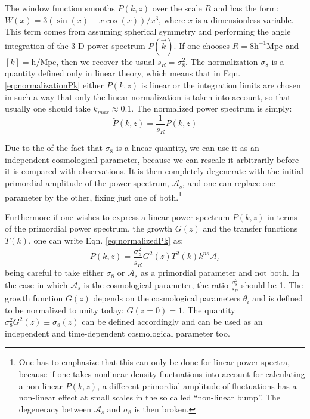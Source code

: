 The window function smooths $P(k,z)$ over the scale $R$ and has
the form: $W(x)=3(\sin(x)-x\cos(x))/x^{3}$, where $x$ is a dimensionless
variable. This term comes from assuming spherical symmetry and performing
the angle integration of the 3-D power spectrum $P(\vec{k})$. If
one chooses $R=8\mbox{h}^{-1}\mbox{Mpc}$ and $[k]=\mbox{h}/\mbox{Mpc}$,
then we recover the usual $s_{R}=\sigma_{8}^{2}$. The normalization
$\sigma_{8}$ is a quantity defined only in linear theory, which means
that in Eqn. \ref{eq:normalizationPk} either $P(k,z)$ is linear
or the integration limits are chosen in such a way that only the linear
normalization is taken into account, so that usually one should take
$k_{max}\approx0.1$. The normalized power spectrum is simply: 
\begin{equation}
\tilde{P}(k,z)=\frac{1}{s_{R}}P(k,z)
\end{equation}


Due to the of the fact that $\sigma_{8}$ is a linear quantity, we
can use it as an independent cosmological parameter, because we can
rescale it arbitrarily before it is compared with observations. It
is then completely degenerate with the initial primordial amplitude
of the power spectrum, $\mathcal{A}_{s}$, and one can replace one
parameter by the other, fixing just one of both.\footnote{One has to emphasize that this can only be done for linear power spectra,
	because if one takes nonlinear density fluctuations into account for
	calculating a non-linear $P(k,z)$, a different primordial amplitude
	of fluctuations has a non-linear effect at small scales in the so
	called ``non-linear bump''. The degeneracy between $\mathcal{A}_{s}$
	and $\sigma_{8}$ is then broken.}

Furthermore if one wishes to express a linear power spectrum $P(k,z)$
in terms of the primordial power spectrum, the growth $G(z)$ and
the transfer functions $T(k)$, one can write Eqn. \ref{eq:normalizedPk}
as: 
\begin{equation}
P(k,z)=\frac{\sigma_{8}^{2}}{s_{R}}G^{2}(z)T^{2}(k)k^{ns}\mathcal{A}_{s}
\end{equation}
being careful to take either $\sigma_{8}$ or $\mathcal{A}_{s}$ as
a primordial parameter and not both. In the case in which $\mathcal{A}_{s}$
is the cosmological parameter, the ratio $\frac{\sigma_{8}^{2}}{s_{R}}$
should be 1. The growth function $G(z)$ depends on the cosmological
parameters $\theta_{i}$ and is defined to be normalized to unity
today: $G(z=0)=1$. The quantity $\sigma_{8}^{2}G^{2}(z)\equiv\sigma_{8}(z)$
can be defined accordingly and can be used as an independent and time-dependent
cosmological parameter too. 


